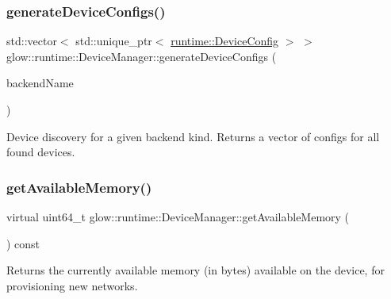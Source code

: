\mbox{\label{classglow_1_1runtime_1_1_device_manager_a3ba362bdcfcc16c652cf1fdd769291db}} 
\subsubsection{\texorpdfstring{generate\+Device\+Configs()}{generateDeviceConfigs()}}
{\footnotesize\ttfamily std\+::vector$<$ std\+::unique\+\_\+ptr$<$ \hyperlink{structglow_1_1runtime_1_1_device_config}{runtime\+::\+Device\+Config} $>$ $>$ glow\+::runtime\+::\+Device\+Manager\+::generate\+Device\+Configs (\begin{DoxyParamCaption}\item[{llvm\+::\+String\+Ref}]{backend\+Name }\end{DoxyParamCaption})\hspace{0.3cm}{\ttfamily [static]}}

Device discovery for a given backend kind. Returns a vector of configs for all found devices. \mbox{\label{classglow_1_1runtime_1_1_device_manager_a5a84ac3b23b9b6d72f50d763913ed8aa}} 
\subsubsection{\texorpdfstring{get\+Available\+Memory()}{getAvailableMemory()}}
{\footnotesize\ttfamily virtual uint64\+\_\+t glow\+::runtime\+::\+Device\+Manager\+::get\+Available\+Memory (\begin{DoxyParamCaption}{ }\end{DoxyParamCaption}) const\hspace{0.3cm}{\ttfamily [pure virtual]}}

\begin{DoxyReturn}{Returns}
the currently available memory (in bytes) available on the device, for provisioning new networks. 
\end{DoxyReturn}



